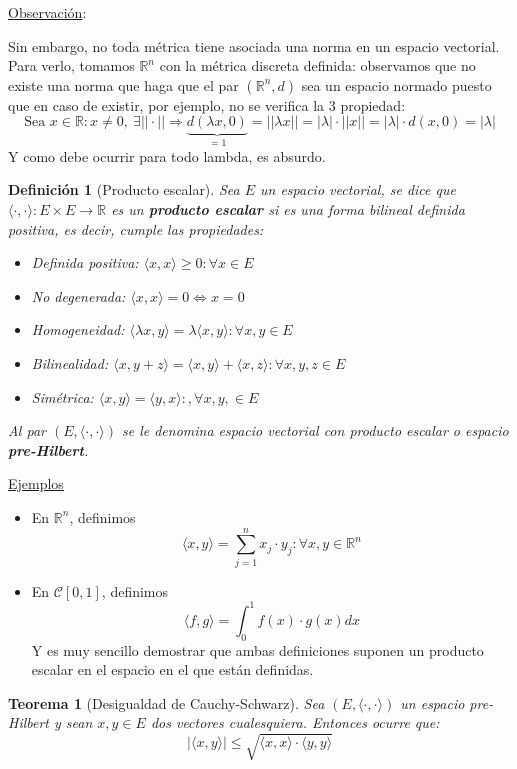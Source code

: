 \documentclass[10pt,a4paper,openright]{book}
\theoremstyle{break}
\newtheorem*{defi}{Definición}
\newtheorem*{theo}{Teorema}
\begin{document}
\underline{Observación}:

Sin embargo, no toda métrica tiene asociada una norma en un espacio vectorial. Para verlo, tomamos $\mathbb R^n$ con la métrica discreta definida: observamos que no existe una norma que haga que el par $(\mathbb R^n, d)$ sea un espacio normado puesto que en caso de existir, por ejemplo, no se verifica la 3 propiedad:
$$\mbox{Sea }x\in \mathbb R: x\neq 0, \ \exists ||\cdot||\Rightarrow\underbrace{d(\lambda x , 0)}_{=1} = ||\lambda x|| = |\lambda|\cdot ||x|| = |\lambda| \cdot d(x,0) = |\lambda|$$
Y como debe ocurrir para todo lambda, es absurdo.

\begin{defi}[Producto escalar]
Sea $E$ un espacio vectorial, se dice que $\langle \cdot, \cdot\rangle: E\times E \rightarrow \mathbb R$ es un \textbf{producto escalar} si es una forma bilineal definida positiva, es decir, cumple las propiedades:
\begin{itemize}
\item Definida positiva: $\langle x,x \rangle \geq 0 : \forall x \in E$
\item No degenerada: $\langle x,x \rangle = 0 \Leftrightarrow x = 0$
\item Homogeneidad: $\langle \lambda x, y \rangle = \lambda \langle x,y\rangle : \forall x, y \in E$
\item Bilinealidad: $\langle x,y+z\rangle = \langle x,y\rangle + \langle x,z\rangle : \forall x, y ,z \in E$
\item Simétrica: $\langle x,y\rangle = \langle y,x\rangle: ,\forall x, y ,\in E$
\end{itemize}
Al par $(E, \langle \cdot, \cdot\rangle)$ se le denomina espacio vectorial con producto escalar o espacio \textbf{pre-Hilbert}.
\end{defi}

\newpage

\underline{Ejemplos}
\begin{itemize}
\item En $\mathbb{R}^n$, definimos $$\langle x,y\rangle = \sum_{j=1}^{n} x_j \cdot y_j : \forall x,y \in \mathbb{R}^n$$

\item En $\mathcal{C}[0,1]$, definimos $$\langle f,g \rangle = \int_{0}^{1} f(x) \cdot g(x) dx$$
Y es muy sencillo demostrar que ambas definiciones suponen un producto escalar en el espacio en el que están definidas.
\end{itemize}

\begin{theo}[Desigualdad de Cauchy-Schwarz]
Sea $(E, \langle\cdot, \cdot\rangle)$ un espacio pre-Hilbert y sean $x,y \in E$ dos vectores cualesquiera. Entonces ocurre que:
$$|\langle x,y\rangle| \leq \sqrt{\langle x,x \rangle \cdot \langle y,y\rangle}$$
\end{theo}
\end{document}
